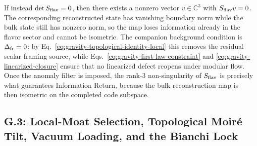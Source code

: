 \documentclass[11pt]{article}
\begin{document}
If instead $\det S_{\rm flav}=0$, then there exists a nonzero vector
$v\in\mathbb C^3$ with $S_{\rm flav}v=0$. The corresponding reconstructed state
has vanishing boundary norm while the bulk state still has nonzero norm, so the
map loses information already in the flavor sector and cannot be isometric.
The companion background condition is $\Delta_{\rm fr}=0$: by
Eq.~\eqref{eq:gravity-topological-identity-local} this removes the residual
scalar framing source, while Eqs.~\eqref{eq:gravity-first-law-constraint} and
\eqref{eq:gravity-linearized-closure} ensure that no linearized defect reopens
under modular flow. Once the anomaly filter is imposed, the rank-$3$
non-singularity of $S_{\rm flav}$ is precisely what guarantees Information
Return, because the bulk reconstruction map is then isometric on the completed
code subspace.

\subsection*{G.3: Local-Moat Selection, Topological Moir\'e Tilt, Vacuum Loading, and the Bianchi Lock}
\end{document}
